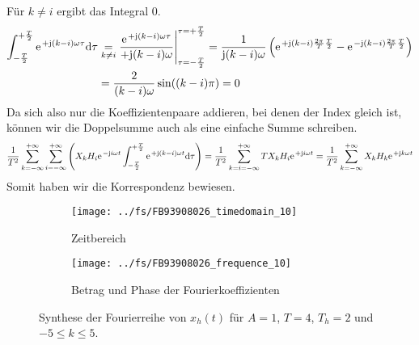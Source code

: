 \documentclass[11pt,a4paper,DIV=12]{scrartcl}
\begin{document}
%
%
Für $k\neq i$ ergibt das Integral $0$.
%
%
\begin{align}
	\int_{-\frac{T}{2}}^{+\frac{T}{2}}\e^{+\im (k-i)\omega \tau}\diff \tau &\underset{k\neq i}{=}\frac{\e^{+\im (k-i)\omega \tau}}{+\im (k-i)\omega}\Bigg |_{\tau=-\frac{T}{2}}^{\tau=+\frac{T}{2}}
	=\frac{1}{\im (k-i)\omega }\left (\e^{+\im (k-i)\frac{2\pi}{T}\frac{T}{2}}-\e^{-\im (k-i)\frac{2\pi}{T}\frac{T}{2}}\right )\nonumber \\
	&=\frac{2}{ (k-i)\omega}\sin((k-i)\pi)=0
\end{align}
%
%
Da sich also nur die Koeffizientenpaare addieren, bei denen der Index gleich ist, können wir die Doppelsumme auch als eine einfache Summe schreiben.
%
%
\begin{align}
	\frac{1}{T^2}\sum_{k=-\infty}^{+\infty}\sum_{i=-\infty}^{+\infty}\left (X_kH_i\e^{-\im i \omega t}\int_{-\frac{T}{2}}^{+\frac{T}{2}}\e^{+\im (k-i)\omega t}\diff \tau \right )
	=\frac{1}{T^2}\sum_{k=i=-\infty}^{+\infty}TX_kH_i\e^{+\im i\omega t}
	=\frac{1}{T^2}\sum_{k=-\infty}^{+\infty}X_kH_k\e^{+\im k \omega t}
\end{align}
Somit haben wir die Korrespondenz bewiesen.
%
%
\begin{figure}
	\centering
	\begin{subfigure}{\textwidth}
		\texttt{[image: ../fs/FB93908026\_timedomain\_10]}
		\caption{Zeitbereich}
	\end{subfigure}
	\begin{subfigure}{\textwidth}
		\texttt{[image: ../fs/FB93908026\_frequence\_10]}
		\caption{Betrag und Phase der Fourierkoeffizienten}
	\end{subfigure}
	\caption{Synthese der Fourierreihe von $x_h(t)$ für $A=1$, $T=4$, $T_h=2$ und
		$-5\leq k\leq5$.}
\end{figure}
%
%
\newpage
\end{document}
